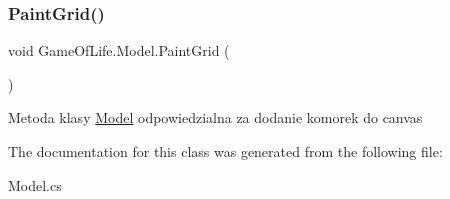 \mbox{\label{class_game_of_life_1_1_model_afded2a6d8bc86d345362e0c3d422e584}} 
\subsubsection{\texorpdfstring{PaintGrid()}{PaintGrid()}}
{\footnotesize\ttfamily void Game\+Of\+Life.\+Model.\+Paint\+Grid (\begin{DoxyParamCaption}{ }\end{DoxyParamCaption})\hspace{0.3cm}{\ttfamily [inline]}}



Metoda klasy \mbox{\hyperlink{class_game_of_life_1_1_model}{Model}} odpowiedzialna za dodanie komorek do canvas 



The documentation for this class was generated from the following file\+:\begin{DoxyCompactItemize}
\item 
Model.\+cs\end{DoxyCompactItemize}

